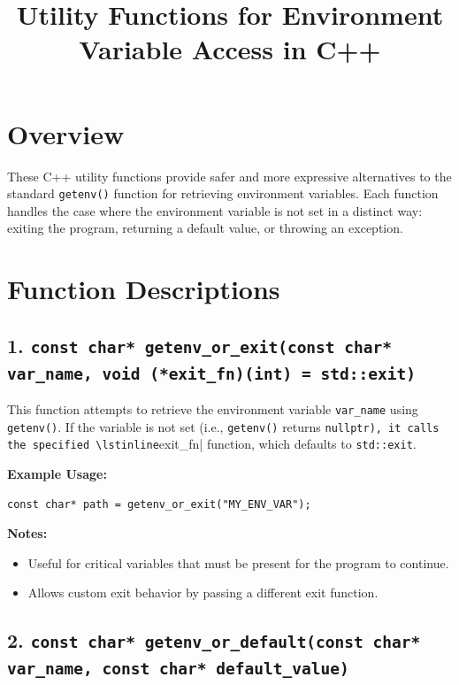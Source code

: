 \documentclass{article}
\title{Utility Functions for Environment Variable Access in C++}
\author{}
\date{}
\begin{document}
\maketitle

\section*{Overview}

These C++ utility functions provide safer and more expressive alternatives to the standard \lstinline|getenv()| function for retrieving environment variables. Each function handles the case where the environment variable is not set in a distinct way: exiting the program, returning a default value, or throwing an exception.

\section*{Function Descriptions}

\subsection*{1. \lstinline|const char* getenv_or_exit(const char* var_name, void (*exit_fn)(int) = std::exit)|}

This function attempts to retrieve the environment variable \lstinline|var_name| using \lstinline|getenv()|. If the variable is not set (i.e., \lstinline|getenv()| returns \lstinline|nullptr), it calls the specified \lstinline|exit\_fn| function, which defaults to \lstinline|std::exit|.

\textbf{Example Usage:}
\begin{lstlisting}
const char* path = getenv_or_exit("MY_ENV_VAR");
\end{lstlisting}

\textbf{Notes:}
\begin{itemize}
  \item Useful for critical variables that must be present for the program to continue.
  \item Allows custom exit behavior by passing a different exit function.
\end{itemize}

\subsection*{2. \lstinline|const char* getenv_or_default(const char* var_name, const char* default_value)|}
\end{document}

